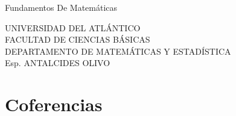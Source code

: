 \documentclass[twocolumn,balance,english,spanish,svgnames,x11names,x11names,HTML]{book}
\begin{document}
\frontmatter \pagestyle{empty} \pagecolor{ptcbackground} 
\vfill
\onecolumn
{\color{white}
\begin{center}
\vspace*{5cm}
  
\Huge{Fundamentos De Matemáticas}

\vspace*{5cm}


\Large{UNIVERSIDAD DEL ATLÁNTICO \\ FACULTAD DE CIENCIAS BÁSICAS \\
DEPARTAMENTO DE MATEMÁTICAS Y ESTADÍSTICA \\ Esp. ANTALCIDES OLIVO}
\end{center}}
\vfill
\let\myclearpage\clearpage\tableofcontents{}\let\myclearpage\relax\newpage{}
\mainmatter \pagestyle{headings}\nocite{*} 
\twocolumn
\chapter{Coferencias}
\Blindtext
%

\backmatter
\end{document}
